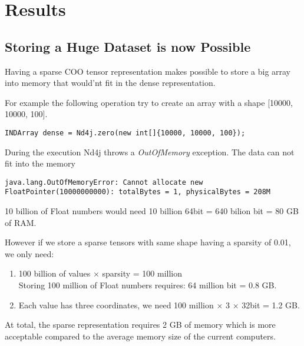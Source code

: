 \chapter{Results}

\section{Storing a Huge Dataset is now Possible}

Having a sparse COO tensor representation makes possible to store a big array into memory that would'nt fit in the dense representation.

For example the following operation try to create an array with a shape [10000, 10000, 100]. 

\begin{lstlisting}[style=nonumbers]
	INDArray dense = Nd4j.zero(new int[]{10000, 10000, 100});
\end{lstlisting}

During the execution Nd4j throws a \textit{OutOfMemory} exception. The data can not fit into the memory
\begin{lstlisting}[style=nonumbers]
	java.lang.OutOfMemoryError: Cannot allocate new FloatPointer(10000000000): totalBytes = 1, physicalBytes = 208M
\end{lstlisting}

10 billion of Float numbers would need 10 billion \time 64bit = 640 bilion bit = 80 GB of RAM.

However if we store a sparse tensors with same shape having a sparsity of 0.01, we only need:
\begin{enumerate}
	\item 100 billion of values $\times$ sparsity = 100 million \\
	Storing 100 million of Float numbers requires: 64 million bit = 0.8 GB.\\
	\item Each value has three coordinates, we need 100 million $\times$ 3 $\times$ 32bit = 1.2 GB.
		
\end{enumerate}
	At total, the sparse representation requires 2 GB of memory which is more acceptable compared to the average memory size of the current computers.

